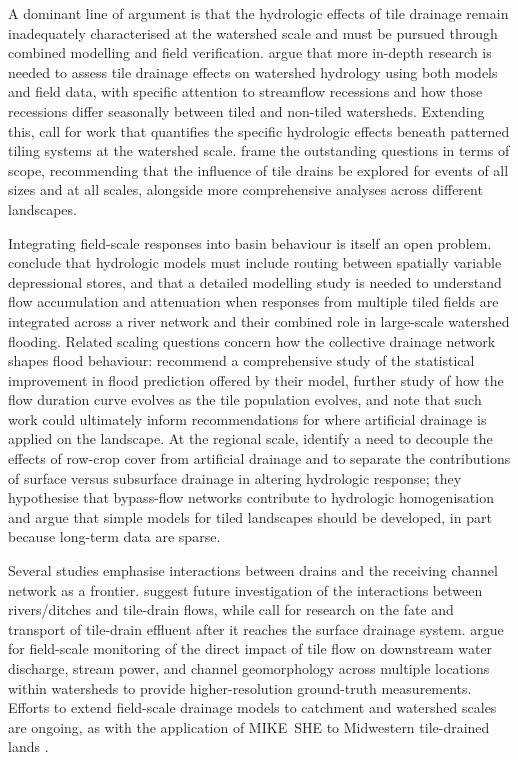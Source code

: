 \documentclass[11pt]{article}
\begin{document}
A dominant line of argument is that the hydrologic effects of tile drainage remain inadequately characterised at the watershed scale and must be pursued through combined modelling and field verification. \textcite{Schilling2008} argue that more in-depth research is needed to assess tile drainage effects on watershed hydrology using both models and field data, with specific attention to streamflow recessions and how those recessions differ seasonally between tiled and non-tiled watersheds. Extending this, \textcite{Schilling2012} call for work that quantifies the specific hydrologic effects beneath patterned tiling systems at the watershed scale. \textcite{Sloan2017} frame the outstanding questions in terms of scope, recommending that the influence of tile drains be explored for events of all sizes and at all scales, alongside more comprehensive analyses across different landscapes.

Integrating field-scale responses into basin behaviour is itself an open problem. \textcite{Sloan2016} conclude that hydrologic models must include routing between spatially variable depressional stores, and that a detailed modelling study is needed to understand flow accumulation and attenuation when responses from multiple tiled fields are integrated across a river network and their combined role in large-scale watershed flooding. Related scaling questions concern how the collective drainage network shapes flood behaviour: \textcite{Fonley2021} recommend a comprehensive study of the statistical improvement in flood prediction offered by their model, further study of how the flow duration curve evolves as the tile population evolves, and note that such work could ultimately inform recommendations for where artificial drainage is applied on the landscape. At the regional scale, \textcite{BolandBrien2014} identify a need to decouple the effects of row-crop cover from artificial drainage and to separate the contributions of surface versus subsurface drainage in altering hydrologic response; they hypothesise that bypass-flow networks contribute to hydrologic homogenisation and argue that simple models for tiled landscapes should be developed, in part because long-term data are sparse.

Several studies emphasise interactions between drains and the receiving channel network as a frontier. \textcite{Grangeon2021} suggest future investigation of the interactions between rivers/ditches and tile-drain flows, while \textcite{Clement2017} call for research on the fate and transport of tile-drain effluent after it reaches the surface drainage system. \textcite{Zhou2025} argue for field-scale monitoring of the direct impact of tile flow on downstream water discharge, stream power, and channel geomorphology across multiple locations within watersheds to provide higher-resolution ground-truth measurements. Efforts to extend field-scale drainage models to catchment and watershed scales are ongoing, as with the application of MIKE~SHE to Midwestern tile-drained lands \parencite{Zhou2013}.
\end{document}
